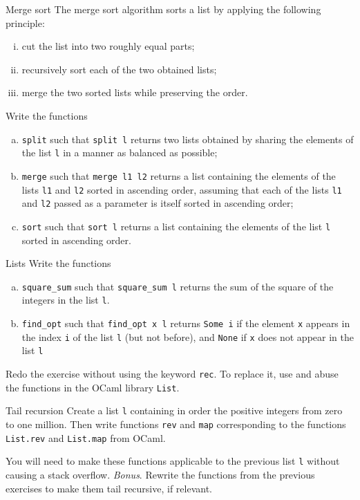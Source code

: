 \begin{problem}{Merge sort}{}
    The merge sort algorithm sorts a list by applying the following principle:
    \begin{enumerate}[(i)]
        \item cut the list into two roughly equal parts;
        \item recursively sort each of the two obtained lists;
        \item merge the two sorted lists while preserving the order.
    \end{enumerate}
    Write the functions
    \begin{enumerate}[(a)]
        \item \lstinline|split| such that \lstinline|split l| returns two lists obtained by sharing the elements of the list \lstinline|l| in a manner as balanced as possible;
        \item \lstinline|merge| such that \lstinline|merge l1 l2| returns a list containing the elements of the lists \lstinline|l1| and \lstinline|l2| sorted in ascending order, assuming that each of the lists \lstinline|l1| and \lstinline|l2| passed as a parameter is itself sorted in ascending order;
        \item \lstinline|sort| such that \lstinline|sort l| returns a list containing the elements of the list \lstinline|l| sorted in ascending order.
    \end{enumerate}
\end{problem}

\begin{problem}{Lists}{}
    Write the functions
    \begin{enumerate}[(a)]
        \item \lstinline|square_sum| such that \lstinline|square_sum l| returns the sum of the square of the integers in the list \lstinline|l|.
        \item \lstinline|find_opt| such that \lstinline|find_opt x l| returns \lstinline|Some i| if the element \lstinline|x| appears in the index \lstinline|i| of the list \lstinline|l| (but not before), and \lstinline|None| if \lstinline|x| does not appear in the list \lstinline|l|
    \end{enumerate}
    Redo the exercise without using the keyword \lstinline|rec|. To replace it, use and abuse the functions in the OCaml library \lstinline|List|.
\end{problem}

\begin{problem}{Tail recursion}{}
    Create a list \lstinline|l| containing in order the positive integers from zero to one million.
    Then write functions \lstinline|rev| and \lstinline|map| corresponding to the functions \lstinline|List.rev| and \lstinline|List.map| from OCaml. 
    
    You will need to make these functions applicable to the previous list \lstinline|l| without causing
    a stack overflow.
    \emph{Bonus}. Rewrite the functions from the previous exercises to make them tail recursive, if
    relevant.
\end{problem}

